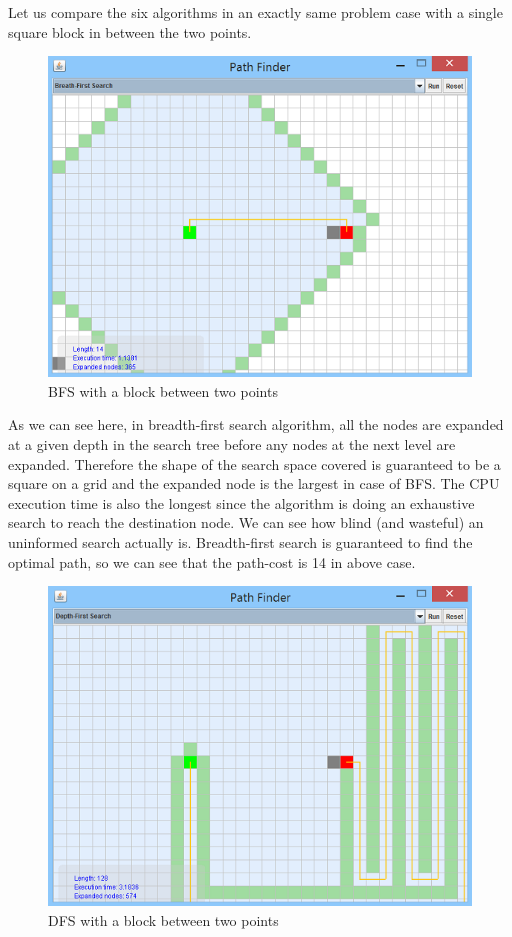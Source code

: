 \documentclass[a4paper]{article}
\begin{document}
\noindent Let us compare the six algorithms in an exactly same problem case with a single square block in between the two points.

\begin{figure}[h!]
  \centering
    \includegraphics[scale=.9]{images/bfs1.png}
  \caption{BFS with a block between two points}
\end{figure}

\noindent As we can see here, in breadth-first search algorithm, all the nodes are expanded at a given depth in the search tree before any nodes at the next level are expanded. Therefore the shape of the search space covered is guaranteed to be a square on a grid and the expanded node is the largest in case of BFS. The CPU execution time is also the longest since the algorithm is doing an exhaustive search to reach the destination node. We can see how blind (and wasteful) an uninformed search actually is. Breadth-first search is guaranteed to find the optimal path, so we can see that the path-cost is 14 in above case. \\

\begin{figure}[h!]
  \centering
    \includegraphics[scale=.9]{images/dfs1.png}
  \caption{DFS with a block between two points}
\end{figure}
\end{document}
